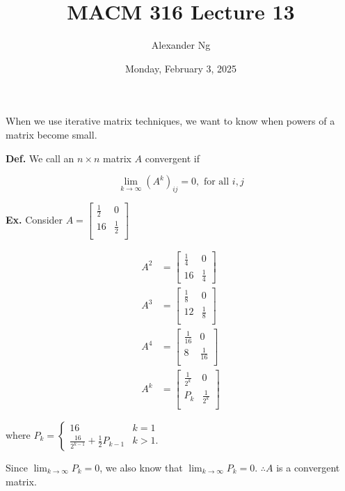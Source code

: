 \documentclass[12pt]{article}
\newcommand{\defn}{\textbf{Def.}\xspace}
\newcommand{\ex}{\textbf{Ex.}\xspace}
\begin{document}
\title{MACM 316 Lecture 13}
\author{Alexander Ng}
\date{Monday, February 3, 2025}

\maketitle

When we use iterative matrix techniques, we want to know when powers of a 
matrix become small.

\defn We call an $n \times n$ matrix $A$ convergent if 

\begin{equation*}
  \lim_{k\to\infty} \left(A^k\right)_{ij} = 0, \text{ for all } i,j
\end{equation*}

\ex Consider $A=\begin{bmatrix}
\frac{1}{2} & 0\\
16 & \frac{1}{2}\\
\end{bmatrix}$

\begin{align*}
  A^2 &= 
  \begin{bmatrix}
    \frac{1}{4} & 0 \\
    16 & \frac{1}{4}
  \end{bmatrix} \\
  A^3 &= 
  \begin{bmatrix}
    \frac{1}{8} & 0\\
    12 & \frac{1}{8}\\
  \end{bmatrix}\\
  A^4 &= 
  \begin{bmatrix}
    \frac{1}{16} & 0\\
    8 & \frac{1}{16}\\
  \end{bmatrix} \\
  A^k &= 
  \begin{bmatrix}
    \frac{1}{2^k} & 0\\
    P_k & \frac{1}{2^k}\\
  \end{bmatrix}
\end{align*}

where $P_k = \begin{cases}
16 & k=1\\
\frac{16}{2^{k-1}} + \frac{1}{2}P_{k-1} & k>1
.\end{cases}$

Since $\lim_{k\to\infty} P_k = 0$, we also know that $\lim_{k\to\infty} P_k = 0$.
$\therefore A$ is a convergent matrix.
\end{document}
